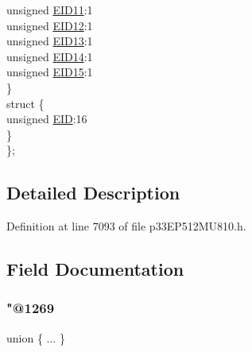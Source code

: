 \begin{DoxyCompactItemize}
\begin{tabbing}
\>\>unsigned \hyperlink{structtag_c2_r_x_f15_e_i_d_b_i_t_s_a710bdb0d602deb021b0be99066008018}{EID11}:1\\
\>\>unsigned \hyperlink{structtag_c2_r_x_f15_e_i_d_b_i_t_s_aa347bb85867bd8d4e0124f7cff8c6472}{EID12}:1\\
\>\>unsigned \hyperlink{structtag_c2_r_x_f15_e_i_d_b_i_t_s_a37d5f3edcbf6ef62f848fd4f3c584f79}{EID13}:1\\
\>\>unsigned \hyperlink{structtag_c2_r_x_f15_e_i_d_b_i_t_s_a7ffc0b0e0d99b8476b6f9a45337c17ab}{EID14}:1\\
\>\>unsigned \hyperlink{structtag_c2_r_x_f15_e_i_d_b_i_t_s_a293cd7dc1746257fa75a60cbd9383cd7}{EID15}:1\\
\>\} \\
\>struct \{\\
\>\>unsigned \hyperlink{structtag_c2_r_x_f15_e_i_d_b_i_t_s_ae80b378c9141f7c03e0b4e55b5f4b54d}{EID}:16\\
\>\} \\
\}; \\

\end{tabbing}\end{DoxyCompactItemize}


\subsection{Detailed Description}


Definition at line 7093 of file p33\+E\+P512\+M\+U810.\+h.



\subsection{Field Documentation}
\mbox{\label{structtag_c2_r_x_f15_e_i_d_b_i_t_s_ae95aa6f0aac738723a66369b501c07a5}} 
\subsubsection{\texorpdfstring{"@1269}{@1269}}
{\footnotesize\ttfamily union \{ ... \} }

\mbox{\label{structtag_c2_r_x_f15_e_i_d_b_i_t_s_ae80b378c9141f7c03e0b4e55b5f4b54d}} 

